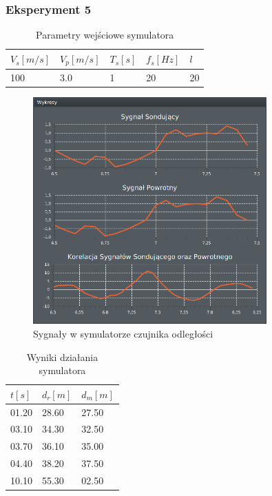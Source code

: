 \documentclass[12pt]{article}
\begin{document}
{{            \subsubsection{Eksperyment 5} {
                \begin{table}[H]
                    \centering
                    \begin{tabular}{|l|l|l|l|l|}
                        \hline
                        $V_s[m/s]$ & $V_p[m/s]$ & $T_s[s]$ & $f_s[Hz]$ & $l$ \\ \hline
                        100        & 3.0        & 1        & 20        & 20 \\ \hline
                    \end{tabular}
                    \caption{Parametry wejściowe symulatora}
                \end{table}
                \begin{figure}[H]
                    \centering
                    \includegraphics[width=0.8\textwidth]{img/result/simulation/experiment5.png}
                    \caption{Sygnały w symulatorze czujnika odległości}
                \end{figure}
                \begin{table}[H]
                    \centering
                    \begin{tabular}{|l|l|l|}
                        \hline
                        $t[s]$ & $d_r[m]$ & $d_m[m]$ \\ \hline
                        01.20  & 28.60    & 27.50    \\ \hline
                        03.10  & 34.30    & 32.50    \\ \hline
                        03.70  & 36.10    & 35.00    \\ \hline
                        04.40  & 38.20    & 37.50    \\ \hline
                        10.10  & 55.30    & 02.50    \\ \hline
                    \end{tabular}
                    \caption{Wyniki działania symulatora}
                \end{table}
            }
            \newpage

        }
    }
\end{document}
